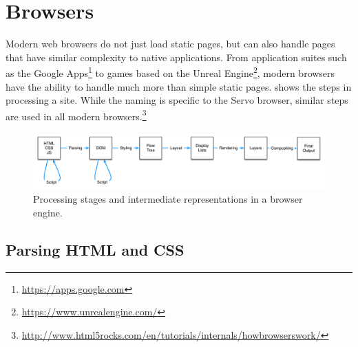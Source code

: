 
\section{Browsers}
\label{sec:browsers}

Modern web browsers do not just load static pages, but can also handle pages that have similar
complexity to native applications.
From application suites such as the Google Apps\footnote{\url{https://apps.google.com}} to games
based on the Unreal Engine\footnote{\url{https://www.unrealengine.com/}},
modern browsers have the ability to handle much more than simple static pages.
 shows the steps in processing a site.
While the naming is specific to the Servo browser, similar steps are used in all modern browsers.\footnote{\url{http://www.html5rocks.com/en/tutorials/internals/howbrowserswork/}}
\begin{figure}[ht]
  \begin{center}
    \includegraphics[scale=0.5]{pics/browser}
  \end{center}%
  \caption{Processing stages and intermediate representations in a browser engine.}
  \label{fig:browser}
\end{figure}%

\subsection{Parsing HTML and CSS}

